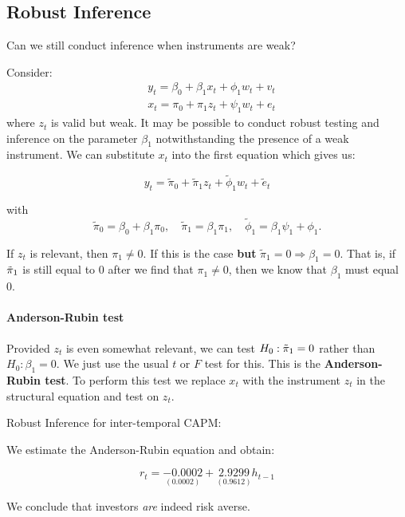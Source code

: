\documentclass[11pt]{article}
\begin{document}
\subsection{Robust Inference}

Can we still conduct inference when instruments are weak?

Consider:
\begin{equation}
\begin{aligned}
& y_t=\beta_0+\beta_1 x_t+\phi_1 w_t+v_t \\
& x_t=\pi_0+\pi_1 z_t+\psi_1 w_t+e_t
\end{aligned}
\end{equation}
where $z_t$ is valid but weak. It may be possible to conduct robust testing and inference on the parameter $\beta_1$ notwithstanding the presence of a weak instrument. We can substitute $x_t$ into the first equation which gives us:

\begin{equation}
y_t=\widetilde{\pi}_0+\widetilde{\pi}_1 z_t+\widetilde{\phi}_1 w_t+\widetilde{e}_t
\end{equation}

with
\begin{equation}
\tilde{\pi}_0=\beta_0+\beta_1 \pi_0, \quad \tilde{\pi}_1=\beta_1 \pi_1, \quad \tilde{\phi}_1=\beta_1 \psi_1+\phi_1 .
\end{equation}

If $z_t$ is relevant, then $\pi_1\neq0$. If this is the case \textbf{but} $\tilde{\pi}_1=0 \Rightarrow\beta_1 = 0$. That is, if $\Tilde{\pi}_1$ is still equal to 0 after we find that $\pi_1\neq0$, then we know that $\beta_1$ must equal 0.

\paragraph{Anderson-Rubin test} \mbox{}

Provided $z_t$ is even somewhat relevant, we can test $H_0: \Tilde{\pi}_1 = 0$ rather than $H_0: \beta_1 = 0$. We just use the usual $t$ or $F$ test for this. This is the \textbf{Anderson-Rubin test}. To perform this test we replace $x_t$ with the instrument $z_t$ in the structural equation and test on $z_t$.

\begin{example}
    Robust Inference for inter-temporal CAPM:

    We estimate the Anderson-Rubin equation and obtain:

    \begin{equation}
r_t=\underset{(0.0002)}{-0.0002}+\underset{(0.9612)}{2.9299} h_{t-1}
\end{equation}

We conclude that investors \textit{are} indeed risk averse.
\end{example}
\end{document}
